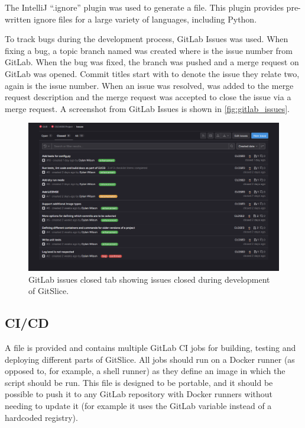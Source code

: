 \documentclass[11pt]{article}
\begin{document}
    The IntelliJ ``.ignore'' plugin was used to generate a  file.
    This plugin provides pre-written ignore files for a large variety of languages, including Python.

    To track bugs during the development process, GitLab Issues was used.
    When fixing a bug, a topic branch named  was created where  is the issue number from GitLab.
    When the bug was fixed, the branch was pushed and a merge request on GitLab was opened.
    Commit titles start with \codeword{[#x]} to denote the issue they relate two, again  is the issue number.
    When an issue was resolved,  was added to the merge request description and the merge request was accepted to close the issue via a merge request.
    A screenshot from GitLab Issues is shown in \autoref{fig:gitlab_issues}.

    \begin{figure}[h]
        \centering
        \includegraphics[width=\textwidth]{gitlab_issues}
        \vspace{-0.5cm}
        \caption[skip=0pt]{GitLab issues closed tab showing issues closed during development of GitSlice.}
        \label{fig:gitlab_issues}
    \end{figure}

    \subsection{CI/CD}
    \label{subsec:ci/cd}

    A  file is provided and contains multiple GitLab CI jobs for building, testing and deploying different parts of GitSlice.
    All jobs should run on a Docker runner (as opposed to, for example, a shell runner) as they define an image in which the script should be run.
    This file is designed to be portable, and it should be possible to push it to any GitLab repository with Docker runners without needing to update it (for example it uses the GitLab  variable instead of a hardcoded registry).
\end{document}

